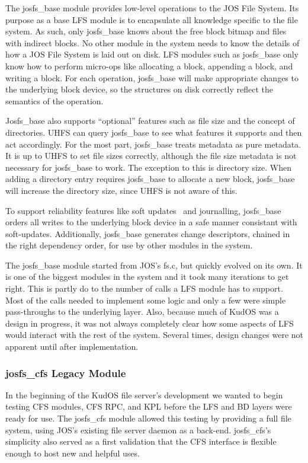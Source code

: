 The josfs\_base module provides low-level operations to the JOS File System.
Its purpose as a base LFS module is to encapsulate all knowledge specific to the
file system. As such, only josfs\_base knows about the free block bitmap and
files with indirect blocks. No other module in the system needs to know the
details of how a JOS File System is laid out on disk. LFS modules such as
josfs\_base only know how to perform micro-ops like allocating a block,
appending a block, and writing a block. For each operation, josfs\_base will
make appropriate changes to the underlying block device, so the structures on
disk correctly reflect the semantics of the operation.

Josfs\_base also supports ``optional'' features such as file size and the
concept of directories. UHFS can query josfs\_base to see what features it
supports and then act accordingly. For the most part, josfs\_base treats
metadata as pure metadata. It is up to UHFS to set file sizes correctly,
although the file size metadata is not necessary for josfs\_base to work. The
exception to this is directory size. When adding a directory entry requires
josfs\_base to allocate a new block, josfs\_base will increase the directory
size, since UHFS is not aware of this.

To support reliability features like soft updates~\cite{ganger00soft} and
journalling, josfs\_base orders all writes to the underlying block device in a
safe manner consistant with soft-updates. Additionally, josfs\_base generates
change descriptors, chained in the right dependency order, for use by other
modules in the system.

The josfs\_base module started from JOS's fs.c, but quickly evolved on its own.
It is one of the biggest modules in the system and it took many iterations to
get right. This is partly do to the number of calls a LFS module has to support.
Most of the calls needed to implement some logic and only a few were simple
pass-throughs to the underlying layer. Also, because much of KudOS was a design
in progress, it was not always completely clear how some aspects of LFS would
interact with the rest of the system. Several times, design changes were not
apparent until after implementation.

\subsubsection{josfs\_cfs Legacy Module}
\label{sec:solution:impl:legacy}

In the beginning of the KudOS file server's development we wanted to begin
testing CFS modules, CFS RPC, and KPL before the LFS and BD layers were ready
for use. The josfs\_cfs module allowed this testing by providing a full file
system, using JOS's existing file server daemon as a back-end. josfs\_cfs's
simplicity also served as a first validation that the CFS interface is flexible
enough to host new and helpful uses.

